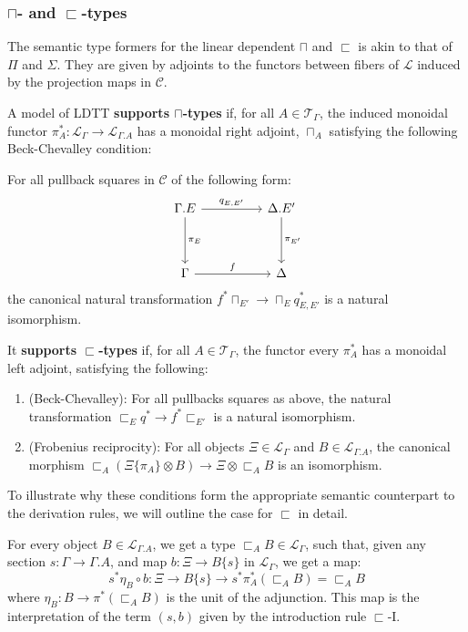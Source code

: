 \documentclass[a4paper,english]{lipics-v2018}
\begin{document}
\subsubsection{$\sqcap$- and $\sqsubset$-types}
The semantic type formers for the linear dependent $\sqcap$ and $\sqsubset$ is akin to that of $\Pi$ and $\Sigma$. They are given by adjoints to the functors between fibers of $\mathcal{L}$ induced by the projection maps in $\mathcal{C}$.
\begin{definition}
  A model of LDTT \textbf{supports $\sqcap$-types} if, for all $A \in \mathcal{T}_{\Gamma}$, the induced monoidal functor $\pi_A^* : \mathcal{L}_{\Gamma} \to \mathcal{L}_{\Gamma.A}$ has a monoidal right adjoint, $\sqcap_A$ satisfying the following Beck-Chevalley condition:

  
  For all pullback squares in $\mathcal{C}$ of the following form:
  \[
      \begin{tikzcd}[row sep=huge, column sep=huge]
    \Gamma.E \ar[d, "\pi_E"] \ar[r, "q_{E, E'}"] & \Delta.E' \ar[d, "\pi_{E'}"] \\
    \Gamma \ar[r, "f"] & \Delta
    \end{tikzcd}
  \]
the canonical natural transformation $f^*\sqcap_{E'} \to \sqcap_{E}q^*_{E, E'}$ is a natural isomorphism.\\
\end{definition}
\begin{definition}
  It \textbf{supports $\sqsubset$-types} if, for all $A \in \mathcal{T}_{\Gamma}$, the functor every $\pi_A^*$ has a monoidal left adjoint, satisfying the following:
  \begin{enumerate}
  \item (Beck-Chevalley): For all pullbacks squares as above, the natural transformation $\sqsubset_Eq^* \to f^*\sqsubset_{E'}$ is a natural isomorphism.
  \item (Frobenius reciprocity): For all objects $\Xi \in \mathcal{L}_{\Gamma}$ and $B \in \mathcal{L}_{\Gamma.A}$, the canonical morphism $\sqsubset_A(\Xi\{\pi_A\} \otimes B) \to \Xi \otimes \sqsubset_AB$ is an isomorphism.
  \end{enumerate}
\end{definition}
To illustrate why these conditions form the appropriate semantic counterpart to the derivation rules, we will outline the case for $\sqsubset$ in detail.


For every object $B \in \mathcal{L}_{\Gamma.A}$, we get a type $\sqsubset_AB \in \mathcal{L}_{\Gamma}$, such that, given any section $s : \Gamma \to \Gamma.A$, and map $b : \Xi \to B\{s\}$ in $\mathcal{L}_{\Gamma}$, we get a map:
\[
  s^*\eta_B \circ b : \Xi \to B\{s\} \to s^*\pi_A^*(\sqsubset_AB) = \sqsubset_AB
\]
where $\eta_B : B \to \pi^*(\sqsubset_AB)$ is the unit of the adjunction.
This map is the interpretation of the term $(s, b)$ given by the introduction rule $\sqsubset$-I.
\end{document}
